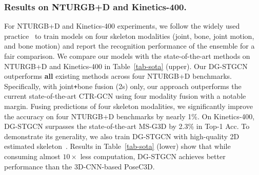 \vspace{-3mm}
\subsubsection{Results on NTURGB+D and Kinetics-400. }

For NTURGB+D and Kinetics-400 experiments, we follow the widely used practice~\cite{chen2021channel,shi2020skeleton} to train models 
on four skeleton modalities (joint, bone, joint motion, and bone motion) and report the recognition performance of the ensemble for a fair comparison.
We compare our models with the state-of-the-art methods on NTURGB+D and Kinetics-400 in Table~\ref{tab-sota} (upper).
Our DG-STGCN outperforms \textbf{all} existing methods across four NTURGB+D benchmarks. 
Specifically, with joint\texttt{+}bone fusion (2s) only, 
our approach outperforms the current state-of-the-art CTR-GCN using four modality fusion with a notable margin. 
Fusing predictions of four skeleton modalities, we significantly improve the accuracy on four NTURGB+D benchmarks by nearly 1\%. 
On Kinetics-400, DG-STGCN surpasses the state-of-the-art MS-G3D by 2.3\% in Top-1 Acc. 
To demonstrate its generality, we also train DG-STGCN with high-quality 2D estimated skeleton~\cite{duan2021revisiting}. 
Results in Table~\ref{tab-sota} (lower) show that while consuming almost $10\times$ less computation, DG-STGCN achieves better performance than the 3D-CNN-based PoseC3D. 


